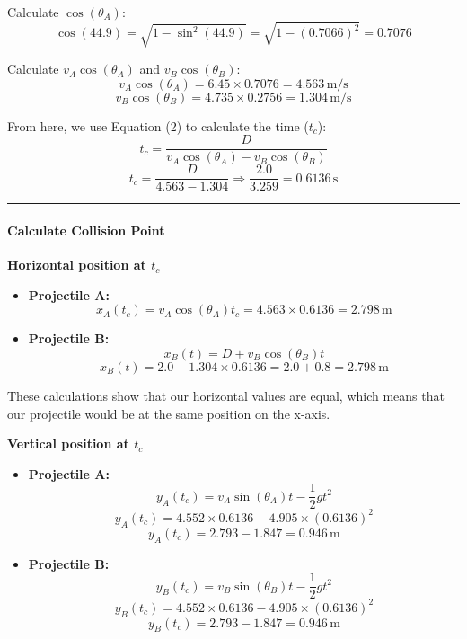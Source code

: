 \documentclass[12pt]{article}
\begin{document}
Calculate \( \cos(\theta_A) \):
\[
\cos(44.9) = \sqrt{1 - \sin^2(44.9)} = \sqrt{1 - (0.7066)^2} = 0.7076
\]

Calculate \( v_A \cos(\theta_A) \) and \( v_B \cos(\theta_B) \):
\[
v_A \cos(\theta_A) = 6.45 \times 0.7076 = 4.563 \, \text{m/s}
\]
\[
v_B \cos(\theta_B) = 4.735 \times 0.2756 = 1.304 \, \text{m/s}
\]

From here, we use Equation (2) to calculate the time (\( t_c \)):
\[
t_c = \frac{D}{v_A \cos(\theta_A) - v_B \cos(\theta_B)}
\]
\[
t_c = \frac{D}{4.563 - 1.304} \Rightarrow \frac{2.0}{3.259} = 0.6136 \, \text{s}
\]

\vspace{0.5cm} %
\begin{center}
    \rule{0.9\textwidth}{0.5pt} %
\end{center}
\vspace{0.5cm} %

\paragraph{\large \textbf{Calculate Collision Point}}

\textbf{Horizontal position at \( t_c \)}
\begin{itemize}
    \item \textbf{Projectile A:}
    \[
    x_A(t_c) = v_A \cos(\theta_A) t_c = 4.563 \times 0.6136 = 2.798 \, \text{m}
    \]
    
    \item \textbf{Projectile B:}
    \[
    x_B(t) = D + v_B \cos(\theta_B) t
    \]
    \[
    x_B(t) = 2.0 + 1.304 \times 0.6136 = 2.0 + 0.8 = 2.798 \, \text{m}
    \]
\end{itemize}

These calculations show that our horizontal values are equal, which means that our projectile would be at the same position on the x-axis.

\textbf{Vertical position at \( t_c \)}
\begin{itemize}
    \item \textbf{Projectile A:}
    \[
    y_A(t_c) = v_A \sin(\theta_A) t - \frac{1}{2} g t^2
    \]
    \[
    y_A(t_c) = 4.552 \times 0.6136 - 4.905 \times (0.6136)^2
    \]
    \[
    y_A(t_c) = 2.793 - 1.847 = 0.946 \, \text{m}
    \]

    \item \textbf{Projectile B:}
    \[
    y_B(t_c) = v_B \sin(\theta_B) t - \frac{1}{2} g t^2
    \]
    \[
    y_B(t_c) = 4.552 \times 0.6136 - 4.905 \times (0.6136)^2
    \]
    \[
    y_B(t_c) = 2.793 - 1.847 = 0.946 \, \text{m}
    \]
\end{itemize}
\end{document}
